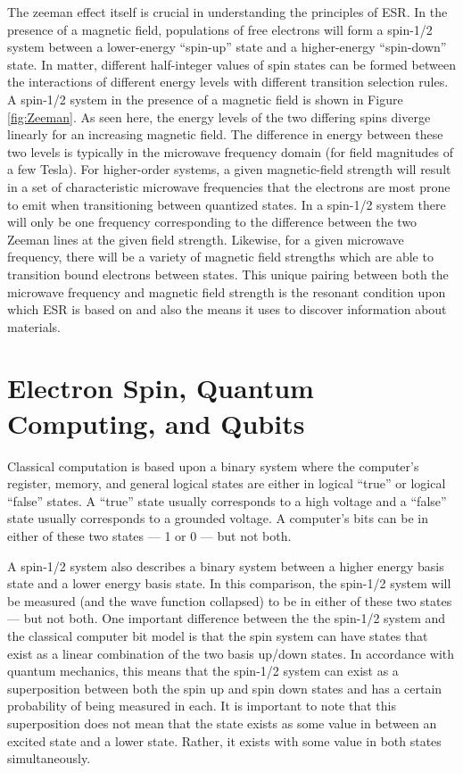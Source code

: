 \documentclass[oneside, noacknowlegments]{BYUPhys}
\begin{document}
The zeeman effect itself is crucial in understanding the principles of ESR. In the presence of a magnetic field, populations of free electrons will form a spin-1/2 system between a lower-energy ``spin-up'' state and a higher-energy ``spin-down'' state. In matter, different half-integer values of spin states can be formed between the interactions of different energy levels with different transition selection rules. A spin-1/2 system in the presence of a magnetic field is shown in Figure \ref{fig:Zeeman}. As seen here, the energy levels of the two differing spins diverge linearly for an increasing magnetic field. The difference in energy between these two levels is typically in the microwave frequency domain (for field magnitudes of a few Tesla). For higher-order systems, a given magnetic-field strength will result in a set of characteristic microwave frequencies that the electrons are most prone to emit when transitioning between quantized states. In a spin-1/2 system there will only be one frequency corresponding to the difference between the two Zeeman lines at the given field strength. Likewise, for a given microwave frequency, there will be a variety of magnetic field strengths which are able to transition bound electrons between states. This unique pairing between both the microwave frequency and magnetic field strength is the resonant condition upon which ESR is based on and also the means it uses to discover information about materials.

\section{Electron Spin, Quantum Computing, and Qubits}

Classical computation is based upon a binary system where the computer's register, memory, and general logical states are either in logical ``true'' or logical ``false'' states. A ``true'' state usually corresponds to a high voltage and a ``false'' state usually corresponds to a grounded voltage. A computer's bits can be in either of these two states --- 1 or 0 --- but not both.

A spin-1/2 system also describes a binary system between a higher energy basis state and a lower energy basis state. In this comparison, the spin-1/2 system will be measured (and the wave function collapsed) to be in either of these two states --- but not both. One important difference between the the spin-1/2 system and the classical computer bit model is that the spin system can have states that exist as a linear combination of the two basis up/down states. In accordance with quantum mechanics, this means that the spin-1/2 system can exist as a superposition between both the spin up and spin down states and has a certain probability of being measured in each. It is important to note that this superposition does not mean that the state exists as some value in between an excited state and a lower state. Rather, it exists with some value in both states simultaneously.
\end{document}
